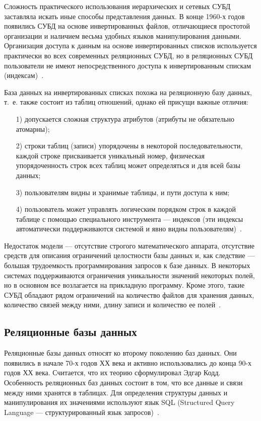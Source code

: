 \documentclass{bmstu}
\begin{document}
Сложность практического использования иерархических и сетевых
СУБД заставляла искать иные способы представления данных. 
В конце 1960-х годов появились СУБД на основе инвертированных файлов, отличающиеся простотой организации и наличием весьма удобных языков манипулирования данными. Организация доступа к данным на основе инвертированных списков используется практически во всех современных реляционных СУБД, но в реляционных СУБД пользователи не имеют непосредственного доступа к инвертированным спискам (индексам)~\cite{Avrunev2018}.

База данных на инвертированных списках похожа на реляционную
базу данных, т.~е. также состоит из таблиц отношений, однако ей присущи важные отличия:

\begin{enumerate}
\item[1)] допускается сложная структура атрибутов (атрибуты не обязательно атомарны);
\item[2)] строки таблиц (записи) упорядочены в некоторой последовательности, каждой строке присваивается уникальный номер, физическая упорядоченность строк всех таблиц может определяться и для всей базы данных;
\item[3)] пользователям видны и хранимые таблицы, и пути доступа к ним;
\item[4)] пользователь может управлять логическим порядком строк в каждой таблице с помощью специального инструмента --- индексов (эти индексы автоматически поддерживаются системой и явно видны пользователям)~\cite{Avrunev2018}.
\end{enumerate}

Недостаток модели --- отсутствие строгого математического аппарата, отсутствие средств для описания ограничений целостности базы данных и, как следствие --- большая трудоемкость программирования запросов к базе данных. 
В некоторых системах поддерживаются ограничения уникальности значений некоторых полей, но в основном все возлагается на
прикладную программу. 
Кроме этого, такие СУБД обладают рядом ограничений на количество файлов для хранения данных, количество
связей между ними, длину записи и количество ее полей~\cite{Avrunev2018}.

\subsection{Реляционные базы данных}

Реляционные базы данных относят ко второму поколению баз данных. 
Они появились в начале 70-х годов ХХ века и активно использовались до конца 90-х годов ХХ века. 
Считается, что их теорию сформулировал Эдгар Кодд. 
Особенность реляционных баз данных состоит в том, что все данные и связи между ними хранятся в таблицах. 
Для определения структуры данных и манипулирования их значениями используют язык SQL (Structured Query Language --- структурированный язык запросов)~\cite{Vinogradov2016}.
\end{document}
